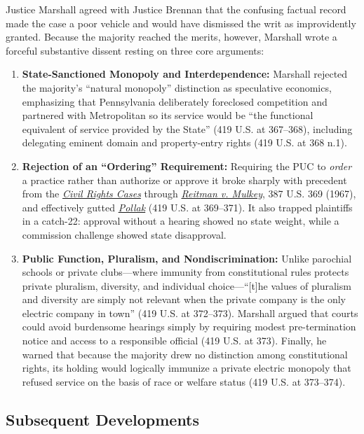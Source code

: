 \documentclass[12pt]{article}
\begin{document}
Justice Marshall agreed with Justice Brennan that the confusing factual record made the case a poor vehicle and would have dismissed the writ as improvidently granted. Because the majority reached the merits, however, Marshall wrote a forceful substantive dissent resting on three core arguments:
\begin{enumerate}
  \item \textbf{State-Sanctioned Monopoly and Interdependence:} Marshall rejected the majority's ``natural monopoly'' distinction as speculative economics, emphasizing that Pennsylvania deliberately foreclosed competition and partnered with Metropolitan so its service would be ``the functional equivalent of service provided by the State'' (419 U.S. at 367--368), including delegating eminent domain and property-entry rights (419 U.S. at 368 n.1).
  \item \textbf{Rejection of an ``Ordering'' Requirement:} Requiring the PUC to \emph{order} a practice rather than authorize or approve it broke sharply with precedent from the \href{https://supreme.justia.com/cases/federal/us/109/3/}{\emph{Civil Rights Cases}} through \href{https://supreme.justia.com/cases/federal/us/387/369/}{\emph{Reitman v. Mulkey}}, 387 U.S. 369 (1967), and effectively gutted \href{https://supreme.justia.com/cases/federal/us/343/451/}{\emph{Pollak}} (419 U.S. at 369--371). It also trapped plaintiffs in a catch-22: approval without a hearing showed no state weight, while a commission challenge showed state disapproval.
  \item \textbf{Public Function, Pluralism, and Nondiscrimination:} Unlike parochial schools or private clubs---where immunity from constitutional rules protects private pluralism, diversity, and individual choice---``[t]he values of pluralism and diversity are simply not relevant when the private company is the only electric company in town'' (419 U.S. at 372--373). Marshall argued that courts could avoid burdensome hearings simply by requiring modest pre-termination notice and access to a responsible official (419 U.S. at 373). Finally, he warned that because the majority drew no distinction among constitutional rights, its holding would logically immunize a private electric monopoly that refused service on the basis of race or welfare status (419 U.S. at 373--374).
\end{enumerate}

\subsection{Subsequent Developments}
\end{document}
